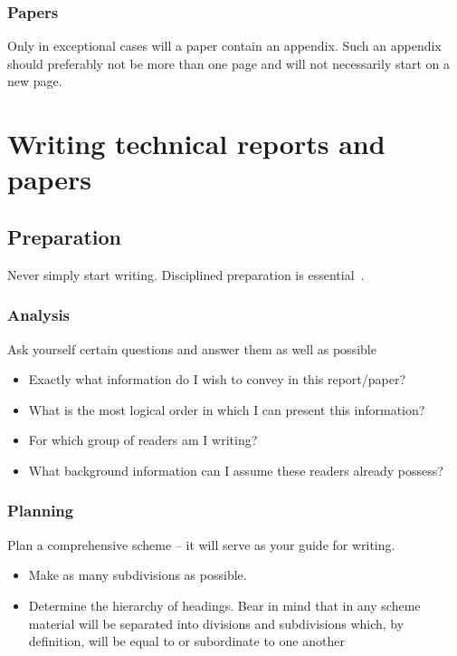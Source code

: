 \documentclass[a5paper, 10pt]{article}
\begin{document}
\subsubsection{Papers}
Only in exceptional cases will a paper contain an appendix.  Such an
appendix should preferably not be more than one page and will not
necessarily start on a new page.

\section{Writing technical reports and papers}
\label{cha:writing-reports}

\subsection{Preparation}
Never simply start writing.  Disciplined preparation is
essential~\citep{johnson}.

\subsubsection{Analysis}

Ask yourself certain questions and answer them as well as possible

\begin{itemize}
\item Exactly what information do I wish to convey in this report/paper?
\item What is the most logical order in which I can present this
  information?
\item For which group of readers am I writing?
\item What background information can I assume these readers already
  possess?
\end{itemize}

\subsubsection{Planning}
Plan a comprehensive scheme -- it will serve as your guide for writing.

\begin{itemize}
\item Make as many subdivisions as possible.
\item Determine the hierarchy of headings.  Bear in mind that in any
  scheme material will be separated into divisions and subdivisions
  which, by definition, will be equal to or subordinate to one another
\end{itemize}
\end{document}
